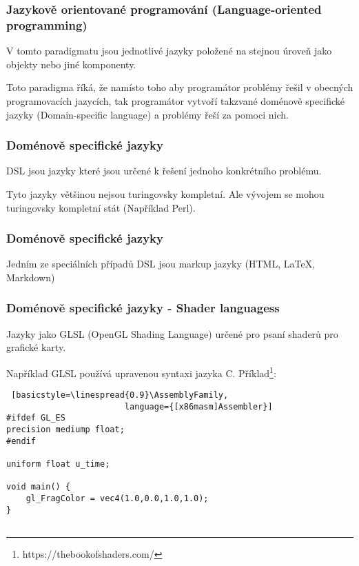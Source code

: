 \begin{frame}
    \frametitle{Jazykově orientované programování (Language-oriented programming)}

    V tomto paradigmatu jsou jednotlivé jazyky položené na stejnou úroveň jako objekty nebo jiné komponenty.

    Toto paradigma říká, že namísto toho aby programátor problémy řešil v obecných programovacích jazycích, tak programátor vytvoří takzvané doménově specifické jazyky (Domain-specific language) a problémy řeší za pomoci nich.

\end{frame}


\begin{frame}
    \frametitle{Doménově specifické jazyky}
    DSL jsou jazyky které jsou určené k řešení jednoho konkrétního problému.

    Tyto jazyky většinou nejsou turingovsky kompletní. Ale vývojem se mohou turingovsky kompletní stát (Například Perl).

    


\end{frame}

\begin{frame}
    \frametitle{Doménově specifické jazyky}

    Jedním ze speciálních případů DSL jsou markup jazyky (HTML, LaTeX, Markdown)



\end{frame}

\begin{frame}[fragile]
    \frametitle{Doménově specifické jazyky - Shader languagess}
    Jazyky jako GLSL (OpenGL Shading Language) určené pro psaní shaderů pro grafické karty.
    
    Například GLSL používá upravenou syntaxi jazyka C. Příklad\footnote{https://thebookofshaders.com/}:

    \newfontfamily{}
    \begin{lstlisting} [basicstyle=\linespread{0.9}\AssemblyFamily,
                        language={[x86masm]Assembler}]
#ifdef GL_ES
precision mediump float;
#endif

uniform float u_time;

void main() {
    gl_FragColor = vec4(1.0,0.0,1.0,1.0);
}
                        
    \end{lstlisting}




\end{frame}

